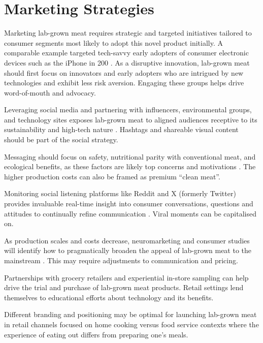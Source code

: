 \documentclass[10pt]{article}
\begin{document}
\begin{sloppypar}
  \section{Marketing Strategies}
  \label{sec:marketing-strategies}

  Marketing lab-grown meat requires strategic and targeted initiatives tailored to consumer segments most likely to adopt this novel product initially. A comparable example targeted tech-savvy early adopters of consumer electronic devices such as the iPhone in 200 \citep{vliert_apple_2021}. As a disruptive innovation, lab-grown meat should first focus on innovators and early adopters who are intrigued by new technologies and exhibit less risk aversion. Engaging these groups helps drive word-of-mouth and advocacy.

  Leveraging social media and partnering with influencers, environmental groups, and technology sites exposes lab-grown meat to aligned audiences receptive to its sustainability and high-tech nature \citep{goodwin_future_2013}. Hashtags and shareable visual content should be part of the social strategy.

  Messaging should focus on safety, nutritional parity with conventional meat, and ecological benefits, as these factors are likely top concerns and motivations \citep{circus_exploring_2018}. The higher production costs can also be framed as premium “clean meat”.

  Monitoring social listening platforms like Reddit and X (formerly Twitter) provides invaluable real-time insight into consumer conversations, questions and attitudes to continually refine communication \citep{verbeke_would_2015}. Viral moments can be capitalised on.

  As production scales and costs decrease, neuromarketing and consumer studies will identify how to pragmatically broaden the appeal of lab-grown meat to the mainstream \citep{verbeke_would_2015}. This may require adjustments to communication and pricing.

  Partnerships with grocery retailers and experiential in-store sampling can help drive the trial and purchase of lab-grown meat products. Retail settings lend themselves to educational efforts about technology and its benefits.


  Different branding and positioning may be optimal for launching lab-grown meat in retail channels focused on home cooking versus food service contexts where the experience of eating out differs from preparing one’s meals.


\end{sloppypar}
\end{document}
